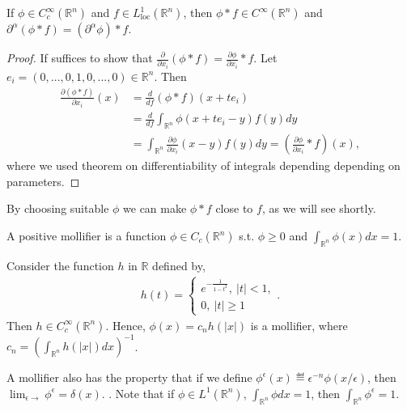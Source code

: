 \begin{lemma}
    If \(\phi\in C^{\infty}_{c}(\mathbb{R}^n)\) and \(f\in L^{1}_{\text{loc}}(\mathbb{R}^n)\), then \(\phi \ast f\in C^{\infty}(\mathbb{R}^n)\) and \(\partial^{\alpha}(\phi\ast f) = (\partial^{\alpha}\phi)\ast f\). 
\end{lemma}
\ifdetailed 
\begin{proof}
    If suffices to show that \(\frac{\partial}{\partial x_i}(\phi\ast f)= \frac{\partial\phi}{\partial x_i}\ast f\). Let \(e_i = (0,...,0,1,0,...,0)\in\mathbb{R}^n\). Then
    \begin{align*}
        \frac{\partial (\phi\ast f)}{\partial x_i}(x) &= \frac{d}{df} (\phi\ast f)(x + te_i) \\
        &= \frac{d}{df}\int_{\mathbb{R}^n}\phi(x+te_i-y)f(y)dy \\ 
        &= \int_{\mathbb{R}^n}\frac{\partial\phi}{\partial x_i}(x-y)f(y)dy = \left(\frac{\partial\phi}{\partial x_i}\ast f\right)(x),
    \end{align*}
    where we used theorem on differentiability of integrals depending depending on parameters. 
\end{proof}
\fi 
By choosing suitable \(\phi\) we can make \(\phi\ast f\) close to \(f\), as we will see shortly.
\begin{definition}
    A positive mollifier is a function \(\phi\in C_c(\mathbb{R}^n)\) s.t. \(\phi\geq 0\) and \(\int_{\mathbb{R}^n}\phi(x)dx=1\).
\end{definition}
\begin{example}
    Consider the function \(h\) in \(\mathbb{R}\) defined by,
    \begin{align*}
        h(t) = \begin{cases}
            e^{-\frac{1}{1-t^2}}, \ |t| < 1, \\
            0, \ |t|\geq 1
        \end{cases}.
    \end{align*}
    Then \(h\in C^{\infty}_{c}(\mathbb{R}^n)\). Hence, \(\phi(x)= c_n h(|x|)\) is a mollifier, where \(c_n = \left(\int_{\mathbb{R}^n}h(|x|)dx\right)^{-1}\).
\end{example}
A mollifier also has the property that if we define \(\phi^{\epsilon}(x) \eqdef \epsilon^{-n}\phi(x/\epsilon)\), then \(\lim_{\epsilon\rightarrow} \phi^{\epsilon} = \delta(x)\). . Note that if \(\phi\in L^1(\mathbb{R}^n)\), \(\int_{\mathbb{R}^n}\phi dx=1\), then \(\int_{\mathbb{R}^n}\phi^{\epsilon}=1\).
